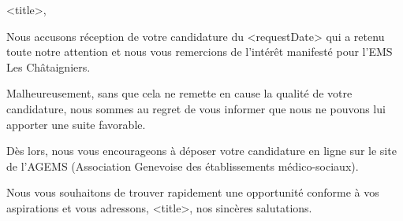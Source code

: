 \documentclass[a4paper, 12pt]{letter}
\begin{document}


<title>,

Nous accusons réception de votre candidature du <requestDate> qui a retenu toute notre attention et nous vous remercions de l’intérêt manifesté pour l’EMS Les Châtaigniers.

Malheureusement, sans que cela ne remette en cause la qualité de votre candidature, nous sommes au regret de vous informer que nous ne pouvons lui apporter une suite favorable.

Dès lors, nous vous encourageons à déposer votre candidature en ligne sur le site de l’AGEMS (Association Genevoise des établissements médico-sociaux).

Nous vous souhaitons de trouver rapidement une opportunité conforme à vos aspirations et vous adressons, <title>, nos sincères salutations.


\end{document}
